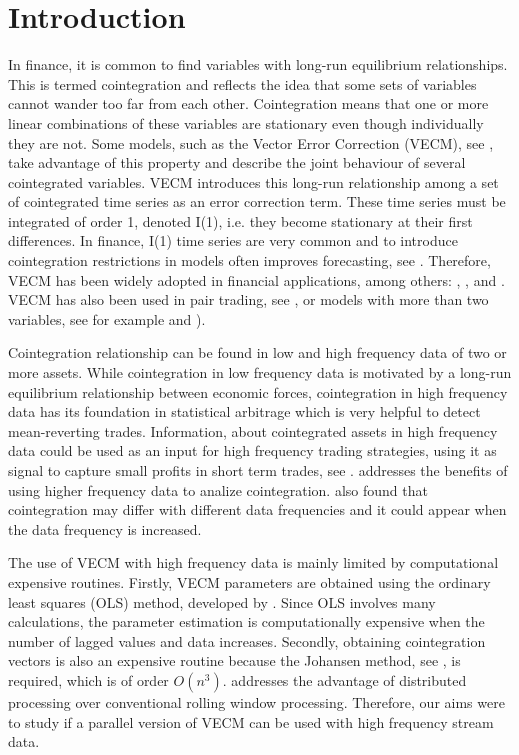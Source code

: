 \section{Introduction}
\label{sec:introduction}
In finance, it is common to find variables with long-run equilibrium
relationships. This is termed cointegration and reflects the idea that some sets
of variables cannot wander too far from each other. Cointegration means that one
or more linear combinations of these variables are stationary even though
individually they are not. Some models, such as the Vector Error Correction
(VECM), see \cite{engle87}, take advantage of this property and describe the
joint behaviour of several cointegrated variables. VECM introduces this long-run
relationship among a set of cointegrated time series as an error correction
term. These time series must be integrated of order 1, denoted I(1), i.e. they
become stationary at their first differences. In finance, I(1) time series are
very common and to introduce cointegration restrictions in models often improves
forecasting, see \cite{duy1998}. Therefore, VECM has been widely adopted in
financial applications, among others: \cite{mukherjee1995}, \cite{seong2013},
\cite{maysami2000} and \cite{arestis2001}. VECM has also been used in pair
trading, see \cite{herlemont2003}, or models with more than two variables, see
for example \cite{mukherjee1995} and \cite{engle2004}).

Cointegration relationship can be found in low and high frequency data of two or
more assets. While cointegration in low frequency data is motivated by a
long-run equilibrium relationship between economic forces, cointegration in high
frequency data has its foundation in statistical arbitrage which is very helpful
to detect mean-reverting trades. Information, about cointegrated assets in high
frequency data could be used as an input for high frequency trading strategies,
using it as signal to capture small profits in short term trades, see
\cite{miao2014}. \cite{zhou2001} addresses the benefits of using higher
frequency data to analize cointegration. \cite{rittler2012} also found that
cointegration may differ with different data frequencies and it could appear
when the data frequency is increased.

The use of VECM with high frequency data is mainly limited by computational
expensive routines. Firstly, VECM parameters are obtained using the ordinary
least squares (OLS) method, developed by \cite{golub1980}. Since OLS involves
many calculations, the parameter estimation is computationally expensive when
the number of lagged values and data increases. Secondly, obtaining
cointegration vectors is also an expensive routine because the Johansen method,
see \cite{johansen1995}, is required, which is of order $O(n^3)$.
\cite{chen2003} addresses the advantage of distributed processing over
conventional rolling window processing. Therefore, our aims were to study if a
parallel version of VECM can be used with high frequency stream data. 

